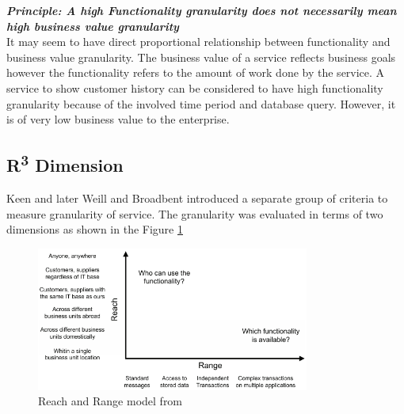 \begin{framed}
\textbf{\textit{Principle: A high Functionality granularity does not necessarily mean high business value granularity}}
\\
It may seem to have direct proportional relationship between functionality and business value granularity. The business value of a service reflects business goals however the functionality refers to the amount of work done by the service. A service to show customer history can be considered to have high functionality granularity because of the involved time period and database query. However, it is of very low business value to the enterprise. \cite{Raf-Haesen:2015aa}
\end{framed}


\subsection{R\textsuperscript{3} Dimension}\label{subsection:granularity/dimensions/r3}
Keen \cite{Keen:2015aa} and later  Weill and Broadbent \cite{Weill:1998aa} introduced a separate group of criteria to measure granularity of service. The granularity was evaluated in terms of two dimensions as shown in the Figure \ref{fig:Reach-Range Model}

\begin{figure}[H]
\begin{center}
\includegraphics[width=0.8\textwidth]{figures/Granularity-R3-one}
\caption{Reach and Range model from \cite{Keen:2015aa, Weill:1998aa}}
\label{fig:Reach-Range Model}
\end{center}
\end{figure}


